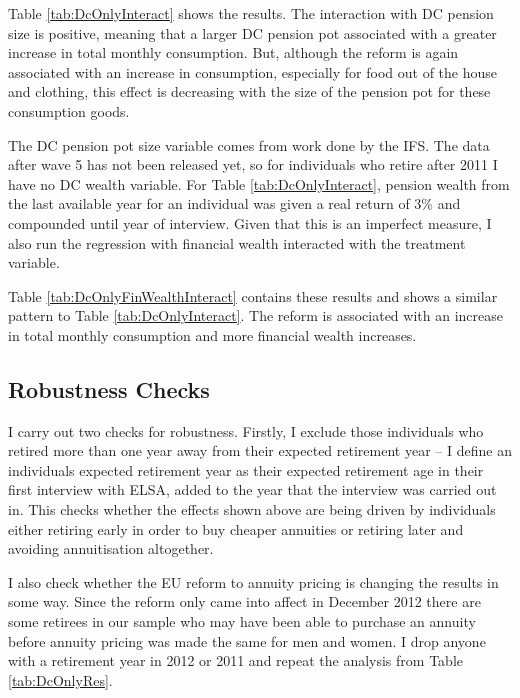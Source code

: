 \documentclass[12pt]{article}
\begin{document}
\begin{landscape}
    \linespread{1}

    
\end{landscape}

\begin{landscape}
    \linespread{1}
    
\end{landscape}

Table \ref{tab:DcOnlyInteract} shows the results. The interaction with DC
pension size is positive, meaning that a larger DC pension pot associated with a
greater increase in total monthly consumption. But, although the reform is again
associated with an increase in consumption, especially for food out of the house
and clothing, this effect is decreasing with the size of the pension pot for
these consumption goods.

The DC pension pot size variable comes from work done by the IFS. The data after
wave 5 has not been released yet, so for individuals who retire after 2011 I
have no DC wealth variable. For Table \ref{tab:DcOnlyInteract}, pension wealth
from the last available year for an individual was given a real return of 3\%
and compounded until year of interview. Given that this is an imperfect measure,
I also run the regression with financial wealth interacted with the treatment
variable.

Table \ref{tab:DcOnlyFinWealthInteract} contains these results and shows a
similar pattern to Table \ref{tab:DcOnlyInteract}. The reform is associated with
an increase in total monthly consumption and more financial wealth increases.

\subsection{Robustness Checks}

I carry out two checks for robustness. Firstly, I exclude those individuals who
retired more than one year away from their expected retirement year -- I define
an individuals expected retirement year as their expected retirement age in
their first interview with ELSA, added to the year that the interview was
carried out in. This checks whether the effects shown above are being driven by
individuals either retiring early in order to buy cheaper annuities or retiring
later and avoiding annuitisation altogether.

I also check whether the EU reform to annuity pricing is changing the results in
some way. Since the reform only came into affect in December 2012 there are some
retirees in our sample who may have been able to purchase an annuity before
annuity pricing was made the same for men and women. I drop anyone with a
retirement year in 2012 or 2011 and repeat the analysis from Table
\ref{tab:DcOnlyRes}.
\end{document}
